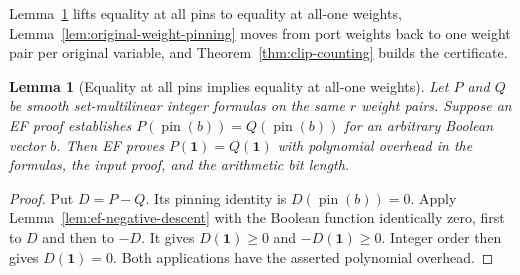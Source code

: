 \documentclass[11pt]{article}
\newtheorem{lemma}[theorem]{Lemma}
\theoremstyle{definition}
\theoremstyle{remark}
\begin{document}
Lemma~\ref{lem:ef-pin-equality} lifts equality at all pins to
equality at all-one weights, Lemma~\ref{lem:original-weight-pinning}
moves from port weights back to one weight pair per original variable,
and Theorem~\ref{thm:clip-counting} builds the certificate.

\begin{lemma}[Equality at all pins implies equality at all-one weights]
\label{lem:ef-pin-equality}
Let $P$ and $Q$ be smooth set-multilinear integer formulas on the
same $r$ weight pairs. Suppose an EF proof establishes
$P(\operatorname{pin}(b))=Q(\operatorname{pin}(b))$ for an arbitrary
Boolean vector $b$. Then EF proves $P(\mathbf1)=Q(\mathbf1)$ with
polynomial overhead in the formulas, the input proof, and the
arithmetic bit length.
\end{lemma}
\begin{proof}
Put $D=P-Q$. Its pinning identity is $D(\operatorname{pin}(b))=0$.
Apply Lemma~\ref{lem:ef-negative-descent} with the Boolean function
identically zero, first to $D$ and then to $-D$. It gives
$D(\mathbf1)\ge0$ and $-D(\mathbf1)\ge0$. Integer order then gives
$D(\mathbf1)=0$. Both applications have the asserted polynomial
overhead.
\end{proof}
\end{document}
